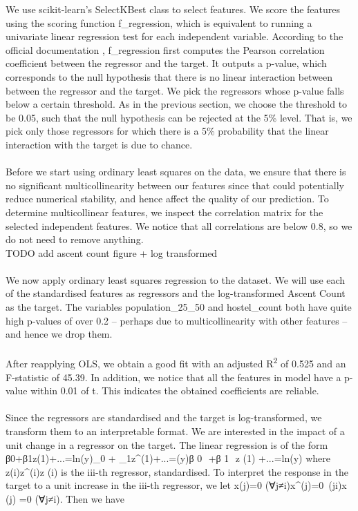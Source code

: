 \documentclass[11pt,a4paper]{article}
\begin{document}
We use scikit-learn's SelectKBest class to select features. We score the features using the scoring function f\_regression, which is equivalent to running a univariate linear regression test for each independent variable. According to the official documentation \cite{scikit-learn}, f\_regression first computes the Pearson correlation coefficient between the regressor and the target. It outputs a p-value, which corresponds to the null hypothesis that there is no linear interaction between between the regressor and the target. We pick the regressors whose p-value falls below a certain threshold. As in the previous section, we choose the threshold to be 0.05, such that the null hypothesis can be rejected at the 5\% level. That is, we pick only those regressors for which there is a 5\% probability that the linear interaction with the target is due to chance. \\ \\
Before we start using ordinary least squares on the data, we ensure that there is no significant multicollinearity between our features since that could potentially reduce numerical stability, and hence affect the quality of our prediction. To determine multicollinear features, we inspect the correlation matrix for the selected independent features. We notice that all correlations are below 0.8, so we do not need to remove anything. \\ 

TODO add ascent count figure + log transformed \\  \\
We now apply ordinary least squares regression to the dataset. We will use each of the standardised features as regressors and the log-transformed Ascent Count as the target. The variables population\_25\_50 and hostel\_count both have quite high p-values of over 0.2 – perhaps due to multicollinearity with other features – and hence we drop them. \\  \\
After reapplying OLS, we obtain a good fit with an adjusted R\textsuperscript{2} of 0.525 and an F-statistic of 45.39. In addition, we notice that all the features in model have a p-value within 0.01 of t. This indicates the obtained coefficients are reliable. \\  \\
Since the regressors are standardised and the target is log-transformed, we transform them to an interpretable format. We are interested in the impact of a unit change in a regressor on the target. The linear regression is of the form β0+β1z(1)+...=ln⁡(y)\beta_0 + \beta_1z^{(1)}+...=\ln(y)β 
0
​	 +β 
1
​	 z 
(1)
 +...=ln(y) where z(i)z^{(i)}z 
(i)
  is the iii-th regressor, standardised. To interpret the response in the target to a unit increase in the iii-th regressor, we let x(j)=0 (∀j≠i)x^{(j)}=0\ (\forall j\neq i)x 
(j)
 =0 (∀j≠i). Then we have
\end{document}
